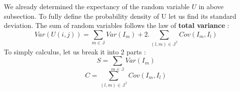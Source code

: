 \documentclass{article}  %
\begin{document}
We already determined the expectancy of the random variable $U$ in above subsection. To fully define the probability density of U
let us find its standard deviation. The sum of random variables follows the law of \textbf{total variance} :
\[
Var(U(i,j)) = \sum_{m \in \mathbb{J}}Var(I_m) + 2.\sum_{(l,m) \in \mathbb{J^2}}Cov(I_m,I_l)
\]
To simply calculus, let us break it into 2 parts :
\[
S = \sum_{m \in \mathbb{J}}Var(I_m)
\]
\[
C = \sum_{(l,m) \in \mathbb{J^2}}Cov(I_m,I_l)
\]


\begin{figure}[h]
\centering
\end{figure}
\end{document}
